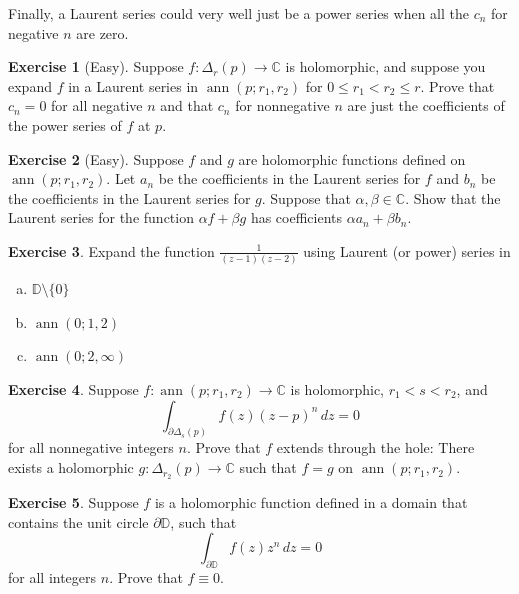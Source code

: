 \documentclass[12pt,openany]{book}
\newcommand{\ann}{\operatorname{ann}}
\newcommand{\C}{{\mathbb{C}}}
\newcommand{\D}{{\mathbb{D}}}
\theoremstyle{plain}
\theoremstyle{remark}
\theoremstyle{definition}
\newenvironment{exbox}{%
    \def\FrameCommand{\vrule width 1pt \relax\hspace{10pt}}%
    \MakeFramed{\advance\hsize-\width\FrameRestore}%
}{%
    \endMakeFramed
}
\newenvironment{exparts}{%
    \leavevmode\begin{enumerate}[a),noitemsep,topsep=0pt,parsep=0pt,partopsep=0pt]
}{%
    \end{enumerate}
}
\theoremstyle{exercise}
\newtheorem{exercise}{Exercise}[section]
\theoremstyle{example}
\begin{document}
Finally, a Laurent series could very well just be a power
series when all the $c_n$ for negative $n$ are zero.

\begin{exbox}
\begin{exercise}[Easy]
Suppose $f \colon \Delta_r(p) \to \C$ is holomorphic, and suppose you expand
$f$ in a Laurent series in $\ann(p;r_1,r_2)$ for $0 \leq r_1 < r_2 \leq r$.
Prove that $c_n = 0$ for all negative $n$ and that $c_n$ for nonnegative $n$
are just the coefficients of the power series of $f$ at $p$.
\end{exercise}

\begin{exercise}[Easy]
Suppose $f$ and $g$ are holomorphic functions defined on
$\ann(p;r_1,r_2)$.  Let $a_n$ be the coefficients in the Laurent series for
$f$ and $b_n$ be the coefficients in the Laurent series for $g$.  Suppose
that $\alpha,\beta \in \C$.  Show that the Laurent series for the function
$\alpha f + \beta g$ has coefficients $\alpha a_n + \beta b_n$.
\end{exercise}

\begin{exercise}
Expand the function $\frac{1}{(z-1)(z-2)}$ using Laurent (or power) series in 
\begin{exparts}
\item $\D \setminus \{ 0 \}$
\item $\ann(0;1,2)$
\item $\ann(0;2,\infty)$
\end{exparts}
\end{exercise}

\begin{exercise}
Suppose $f \colon \ann(p;r_1,r_2) \to \C$ is holomorphic,
$r_1 < s < r_2$, and
\begin{equation*}
\int_{\partial \Delta_{s}(p)} f(z){(z-p)}^n
 \, dz = 0
\end{equation*}
for all nonnegative integers $n$.  Prove that $f$ extends through the hole:
There exists a holomorphic $g \colon \Delta_{r_2}(p) \to \C$ such that 
$f = g$ on $\ann(p;r_1,r_2)$.
\end{exercise}

\begin{exercise}
Suppose $f$ is a holomorphic function defined in a domain that contains
the unit circle $\partial \D$, such that
\begin{equation*}
\int_{\partial \D} f(z)z^n
 \, dz = 0
\end{equation*}
for all integers $n$.  Prove that $f \equiv 0$.
\end{exercise}
\end{exbox}
\end{document}
